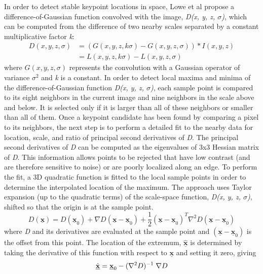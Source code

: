\documentclass{llncs}
\begin{document}
In order to detect stable keypoint locations in space, Lowe et al \cite{Lowe:04} propose a difference-of-Gaussian function convolved with the image, \textit{D(x, y, z, $\sigma$)}, which can be computed from the difference of two nearby scales separated by a constant multiplicative factor \textit{k}:
\begin{align}
    D(x,y,z,\sigma) &= (G(x,y,z,k\sigma) - G(x,y,z,\sigma)) * I(x,y,z) \\
                    &= L(x, y, z, k\sigma) - L(x, y, z, \sigma) \nonumber
\end{align}
where $G(x,y,z,\sigma)$ represents the convolution with a Gaussian operator of variance $\sigma^2$ and \textit{k} is a constant. In order to detect local maxima and minima of the difference-of-Gaussian function \textit{D(x, y, z, $\sigma$)}, each sample point is compared to its eight neighbors in the current image and nine neighbors in the scale above and below. It is selected only if it is larger than all of these neighbors or smaller than all of them. Once a keypoint candidate has been found by comparing a pixel to its neighbors, the next step is to perform a detailed fit to the nearby data for location, scale, and ratio of principal second derivatives of \emph{D}. The principal second derivatives of \emph{D} can be computed as the eigenvalues of 3x3 Hessian matrix of \emph{D}. This information allows points to be rejected that have low contrast (and are therefore sensitive to noise) or are poorly localized along an edge. To perform the fit, a 3D quadratic function is fitted to the local sample points in order to determine the interpolated location of the maximum. The approach uses Taylor expansion (up to the quadratic terms) of the scale-space function, \textit{D(x, y, z, $\sigma$)}, shifted so that the origin is at the sample point.
\begin{equation}
    D(\underline{\mathbf{x}}) = D(\underline{\mathbf{x}}_0) + \nabla D (\underline{\mathbf{x}} - \underline{\mathbf{x}}_0) + \frac{1}{2} (\underline{\mathbf{x}} - \underline{\mathbf{x}}_0)^T \nabla^2 D (\underline{\mathbf{x}} - \underline{\mathbf{x}}_0) 
\end{equation}
where \emph{D} and its derivatives are evaluated at the sample point and $(\underline{\mathbf{x}} - \underline{\mathbf{x}}_0)$ is the offset from this point. The location of the extremum, $\underline{\hat{\mathbf{x}}}$ is determined by taking the derivative of this function with respect to $\underline{\mathbf{x}}$ and setting it zero, giving
\begin{equation}
    \underline{\hat{\mathbf{x}}} = \underline{\mathbf{x}}_0 - (\nabla^2 D)^{-1} \hspace{1mm} \nabla D
\end{equation}
\end{document}
